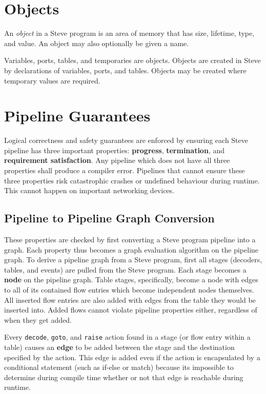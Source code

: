 \section{Objects} \label{object_guide}

An \textit{object} in a Steve program is an area of memory that has size, lifetime, type, and value. An object may also optionally be given a name.

Variables, ports, tables, and temporaries are objects. Objects are created in Steve by declarations of variables, ports, and tables. Objects may be created where temporary values are required.

\section{Pipeline Guarantees} \label{pipeline_checking_guide}

Logical correctness and safety guarantees are enforced by ensuring each Steve pipeline has three important properties: \textbf{progress}, \textbf{termination}, and \textbf{requirement satisfaction}. Any pipeline which does not have all three properties shall produce a compiler error. Pipelines that cannot ensure these three properties risk catastrophic crashes or undefined behaviour during runtime. This cannot happen on important networking devices.

\subsection{Pipeline to Pipeline Graph Conversion} \label{pipeline_graph}

These properties are checked by first converting a Steve program pipeline into a graph. Each property thus becomes a graph evaluation algorithm on the pipeline graph. To derive a pipeline graph from a Steve program, first all stages (decoders, tables, and events) are pulled from the Steve program. Each stage becomes a \textbf{node} on the pipeline graph. Table stages, specifically, become a node with edges to all of its contained flow entries which become independent nodes themselves. All inserted flow entries are also added with edges from the table they would be inserted into. Added flows cannot violate pipeline properties either, regardless of when they get added.

Every \texttt{decode}, \texttt{goto}, and \texttt{raise} action found in a stage (or flow entry within a table) causes an \textbf{edge} to be added between the stage and the destination specified by the action. This edge is added even if the action is encapsulated by a conditional statement (such as if-else or match) because its impossible to determine during compile time whether or not that edge is reachable during runtime. 

